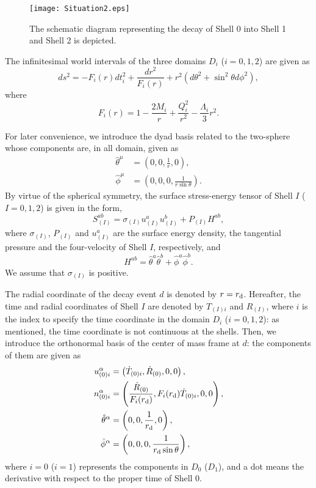 \documentclass[aps,preprint,preprintnumber,nofootinbib,amsmath,amssymb,ascmac,bm,12pt]{revtex4}
\newcommand{\rd}{r_{\rm d}}
\newcommand{\thetah}{\hat{\theta}}
\newcommand{\phih}{\hat{\phi}}
\begin{document}
\begin{figure}[htbp]
 \begin{center}
 \texttt{[image: Situation2.eps]}
 \end{center}
 \caption{
The schematic diagram representing the decay of Shell 0 into Shell 1 and Shell 2 is depicted.   }
 \label{Situation2}
\end{figure}

The infinitesimal world intervals of the three domains $D_i$ ($i=0,1,2$) are given as
$$
ds^2=-F_i(r)dt_i^2+\frac{dr^2}{F_i(r)}+r^2(d\theta^2+\sin^2\theta d\phi^2),
$$
where
$$
F_i(r)=1-\frac{2M_i}{r}+\frac{Q_i^2}{r^2}-\frac{\Lambda_i}{3} r^2.
$$

For later convenience, we introduce the dyad basis related to the two-sphere whose components 
are, in all domain, given as  
\begin{align}
\thetah^\mu&=\left(0,0,\frac{1}{r},0\right), \\
\phih^\mu&=\left(0,0,0,\frac{1}{r\sin\theta}\right).
\end{align}
By virtue of the spherical symmetry, the surface stress-energy tensor of Shell $I$ ($I=0,1,2$) is given in the form,
\begin{equation}
S^{ab}_{(I)}=\sigma_{(I)}u_{(I)}^a u_{(I)}^b+P_{(I)}H^{ab},
\end{equation}
where $\sigma_{(I)}$, $P_{(I)}$ and $u_{(I)}^a$ are the surface energy density, the tangential pressure 
and the four-velocity of Shell $I$, respectively, and 
$$
H^{ab}=\thetah^a \thetah^b+ \phih^a \phih^b.
$$
We assume that $\sigma_{(I)}$ is positive. 

The radial coordinate of the decay event $d$ is denoted by $r=\rd$. 
Hereafter, the time and radial coordinates of Shell $I$ are denoted by $T_{(I)i}$ and $R_{(I)}$, 
where $i$ is the index to specify the time coordinate in the domain $D_i$ ($i=0,1,2$): as mentioned, 
the time coordinate is not continuous at the shells. 
Then, we introduce the orthonormal basis of the center of mass frame at $d$: 
the components of them are given as
\begin{align}
u^\alpha_{(0)i}&=\left(\dot{T}_{(0)i},\dot{R}_{(0)},0,0\right), \label{u-def}\\
n^\alpha_{(0)i}&=\left(\frac{\dot{R}_{(0)}}{F_i(\rd)},F_i(\rd)\dot{T}_{(0)i},0,0\right), \\
\thetah^\alpha&=\left(0,0,\frac{1}{\rd},0\right), \\
\phih^\alpha&=\left(0,0,0,\frac{1}{\rd\sin\theta}\right), \label{phi-def}
\end{align}
where $i=0$ ($i=1$) represents the components in $D_0$ ($D_1$), 
and a dot means the derivative with respect to the proper time of Shell 0. 
\end{document}
